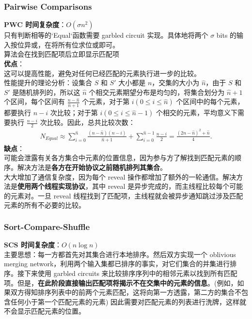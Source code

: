 \subsubsection{ Pairwise Comparisons }
\noindent \textbf{PWC 时间复杂度}：$O(\sigma n^2)$\\
只有判断相等的`Equal`函数需要 garbled circuit 实现。具体地将两个 $\sigma$ bits 的输入按位异或，在将所有位求位或即可。\\
算法会在找到匹配项后立即显示匹配项\\
  \textbf{优点}：\\
  这可以提高性能，避免对任何已经匹配的元素执行进一步的比较。\\
  性能提升的理论分析：设集合 $S$ 和 $S'$ 大小都是 $n$，交集的大小为 $\hat{n}$，由于 $S$ 和 $S'$ 是随机排列的，所以这 $\hat{n}$ 个相交元素期望分布是均匀的，将集合划分为 $\hat{n}+1$ 个区间，每个区间有 $\frac{n-\hat{n}}{\hat{n}+1}$ 个元素，对于第 $i(0\le i\le \hat{n})$ 个区间中的每个元素，都要执行 $n-i$ 次比较；对于第 $i(0\le i\le \hat{n}-1)$ 个相交的元素，平均意义下需要执行 $\frac{n-i}{2}$ 次比较。因此，总共比较次数：\\
  $$\begin{aligned}
    N_{Equal}\approx \sum_{i=0}^{\hat{n}}\frac{(n-\hat{n})(n-i)}{\hat{n}+1}+\sum_{i=0}^{\hat{n}-1}\frac{n-i}{2}=\frac{(2n-\hat{n})^2+\hat{n}}{4}.
  \end{aligned}$$
  \textbf{缺点}：\\
  可能会泄露有关各方集合中元素的位置信息，因为参与方了解找到匹配元素的顺序。解决方法是\textbf{各方在开始协议之前随机排列其集合}。\\
  大大增加了通信复杂度，因为每个 reveal 操作都增加了额外的一轮通信。解决方法是\textbf{使用两个线程实现协议}，其中 reveal 是异步完成的，而主线程比较每个可能的元素对。一旦 reveal 线程找到了匹配项，主线程就会被异步通知跳过涉及匹配元素的所有不必要的比较。\\
  \subsubsection{ Sort-Compare-Shuffle}
\noindent \textbf{SCS 时间复杂度}：$O(n\log n)$\\
主要思想：每一方都首先对其集合进行本地排序。然后双方实现一个 oblivious merging network，利用两个输入集都已排序的事实，对它们集合的并集进行排序。接下来使用 garbled circuits 来比较排序序列中的相邻元素以找到所有匹配项。但是，\textbf{在此阶段直接输出匹配项将揭示不在交集中的元素的信息}。(例如，如果双方得知排序列表中的前两个元素匹配，这将向第一方透露，第二方的集合不包含任何小于第一个匹配元素的元素) 因此需要对匹配元素的列表进行洗牌，这样就不会显示匹配元素的位置。

